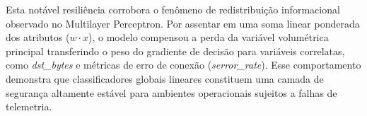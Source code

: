 Esta notável resiliência corrobora o fenômeno de redistribuição informacional observado no Multilayer Perceptron. Por assentar em uma soma linear ponderada dos atributos ($w \cdot x$), o modelo compensou a perda da variável volumétrica principal transferindo o peso do gradiente de decisão para variáveis correlatas, como \textit{dst\_bytes} e métricas de erro de conexão (\textit{serror\_rate}). Esse comportamento demonstra que classificadores globais lineares constituem uma camada de segurança altamente estável para ambientes operacionais sujeitos a falhas de telemetria.
